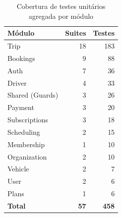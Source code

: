 \begin{table}[H]
\centering
\caption{Cobertura de testes unitários agregada por módulo}
\label{tab:testes}
\begin{tabular}{lrr}
\toprule
\textbf{Módulo} & \textbf{Suites} & \textbf{Testes} \\
\midrule
Trip & 18 & 183 \\
Bookings & 9 & 88 \\
Auth & 7 & 36 \\
Driver & 4 & 33 \\
Shared (Guards) & 3 & 26 \\
Payment & 3 & 20 \\
Subscriptions & 3 & 18 \\
Scheduling & 2 & 15 \\
Membership & 1 & 10 \\
Organization & 2 & 10 \\
Vehicle & 2 & 7 \\
User & 2 & 6 \\
Plans & 1 & 6 \\
\midrule
\textbf{Total} & \textbf{57} & \textbf{458} \\
\bottomrule
\end{tabular}
\end{table}
